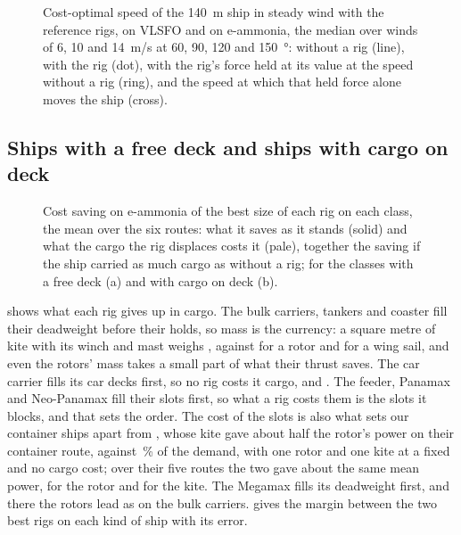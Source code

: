 \begin{figure}[tbp]
\centering
{}
\caption{ Cost-optimal speed of the \SI{140}{m} ship in steady wind with the reference rigs, on VLSFO and on e-ammonia, the median over winds of 6, 10 and \SI{14}{m/s} at 60, 90, 120 and \SI{150}{\degree}: without a rig (line), with the rig (dot), with the rig's force held at its value at the speed without a rig (ring), and the speed at which that held force alone moves the ship (cross). }
\label{fig:speed_choice}
\end{figure}

\subsection{Ships with a free deck and ships with cargo on deck}
\label{sec:res_groups}

\begin{figure}[tbp]
\centering
{}
\caption{Cost saving on e-ammonia of the best size of each rig on each class, the mean over the six routes: what it saves as it stands (solid) and what the cargo the rig displaces costs it (pale), together the saving if the ship carried as much cargo as without a rig; for the classes with a free deck (a) and with cargo on deck (b).}
\label{fig:cargo_cost}
\end{figure}

 shows what each rig gives up in cargo. The bulk carriers, tankers and coaster fill their deadweight before their holds, so mass is the currency: a square metre of kite with its winch and mast weighs , against  for a rotor and  for a wing sail, and even the rotors' mass takes a small part of what their thrust saves. The car carrier fills its car decks first, so no rig costs it cargo, and \NumVerdictCarCarrier{}. The feeder, Panamax and Neo-Panamax fill their slots first, so what a rig costs them is the slots it blocks, and that sets the order.  The cost of the slots is also what sets our container ships apart from \citet{traut2014}, whose kite gave about half the rotor's power on their container route,  against \,\% of the demand, with one rotor and one  kite at a fixed  and no cargo cost; over their five routes the two gave about the same mean power,  for the rotor and  for the kite. The Megamax fills its deadweight first, and there the rotors lead as on the bulk carriers.  gives the margin between the two best rigs on each kind of ship with its error.

